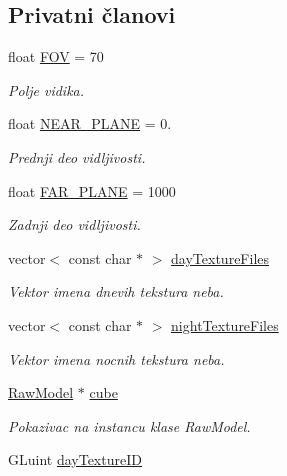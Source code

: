 \subsection*{Privatni članovi}
\begin{DoxyCompactItemize}
\item 
float \hyperlink{classcore_1_1SkyboxRenderer_added919bd8c7e122c8c5702b9cb0e5e7}{F\+OV} = 70
\begin{DoxyCompactList}\small\item\em Polje vidika. \end{DoxyCompactList}\item 
float \hyperlink{classcore_1_1SkyboxRenderer_ad5fc53b032c0cde164920baf85d0bb56}{N\+E\+A\+R\+\_\+\+P\+L\+A\+NE} = 0.
\begin{DoxyCompactList}\small\item\em Prednji deo vidljivosti. \end{DoxyCompactList}\item 
float \hyperlink{classcore_1_1SkyboxRenderer_a304ec1ed4e472a481bd4b78ffa49d520}{F\+A\+R\+\_\+\+P\+L\+A\+NE} = 1000
\begin{DoxyCompactList}\small\item\em Zadnji deo vidljivosti. \end{DoxyCompactList}\item 
vector$<$ const char $\ast$ $>$ \hyperlink{classcore_1_1SkyboxRenderer_ad80185112c11644ffc888f86ed8282b1}{day\+Texture\+Files}
\begin{DoxyCompactList}\small\item\em Vektor imena dnevih tekstura neba. \end{DoxyCompactList}\item 
vector$<$ const char $\ast$ $>$ \hyperlink{classcore_1_1SkyboxRenderer_aa53670cdc9ac01d301dd873213befa1a}{night\+Texture\+Files}
\begin{DoxyCompactList}\small\item\em Vektor imena nocnih tekstura neba. \end{DoxyCompactList}\item 
\hyperlink{classmodel_1_1RawModel}{Raw\+Model} $\ast$ \hyperlink{classcore_1_1SkyboxRenderer_a1a68b3bd047fc64ce132ae5c21ad9e77}{cube}
\begin{DoxyCompactList}\small\item\em Pokazivac na instancu klase Raw\+Model. \end{DoxyCompactList}\item 
G\+Luint \hyperlink{classcore_1_1SkyboxRenderer_a4500833da09fe980955bc6f354b042ff}{day\+Texture\+ID}

\end{DoxyCompactItemize}
